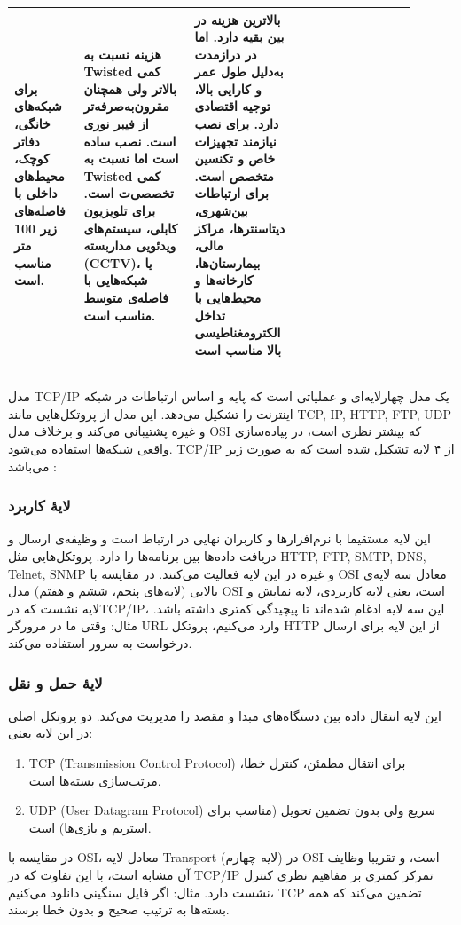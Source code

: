 \documentclass[12pt]{article}
\begin{document}
\begin{center}
\begin{table}[h]
\begin{tabular}{|p{0.15\linewidth}|p{0.25\linewidth}|p{0.25\linewidth}|p{0.25\linewidth}|}
				برای شبکه‌های خانگی، دفاتر کوچک، محیط‌های داخلی با فاصله‌های زیر 100 متر مناسب است. &
				هزینه نسبت به Twisted کمی بالاتر ولی همچنان مقرون‌به‌صرفه‌تر از فیبر نوری است. 
				نصب ساده است اما نسبت به Twisted کمی تخصصی‌ت است. برای تلویزیون کابلی، 
				سیستم‌های ویدئویی مداربسته (CCTV)، یا شبکه‌هایی با فاصله‌ی متوسط مناسب است. &
				بالاترین هزینه در بین بقیه دارد. اما در درازمدت به‌دلیل طول عمر و کارایی بالا، 
				توجیه اقتصادی دارد. برای نصب نیازمند تجهیزات خاص  و تکنسین متخصص است. 
				برای ارتباطات بین‌شهری، دیتاسنترها، مراکز مالی، بیمارستان‌ها، کارخانه‌ها و محیط‌هایی با 
				تداخل الکترومغناطیسی بالا مناسب است \\
				\hline
			\end{tabular}
		\end{table}
	\end{center}
	
	\subsection{}
	مدل TCP/IP یک مدل چهارلایه‌ای و عملیاتی است که پایه و اساس ارتباطات در شبکه اینترنت را تشکیل می‌دهد. این مدل از پروتکل‌هایی مانند \textenglish{TCP, IP, HTTP, FTP, UDP} و غیره پشتیبانی می‌کند و برخلاف مدل OSI که بیشتر نظری است، در پیاده‌سازی واقعی شبکه‌ها استفاده می‌شود. TCP/IP از ۴ لایه تشکیل شده است که به صورت زیر می‌باشد 
	\cite{a8, a9, a10}:
	\subsubsection*{لایهٔ کاربرد}
	این لایه مستقیما با نرم‌افزارها و کاربران نهایی در ارتباط است و وظیفه‌ی ارسال و دریافت داده‌ها بین برنامه‌ها را دارد. پروتکل‌هایی مثل \textenglish{HTTP, FTP, SMTP, DNS, Telnet, SNMP} و غیره در این لایه فعالیت می‌کنند. در مقایسه با OSI معادل سه لایه‌ی بالایی (لایه‌های پنجم، ششم و هفتم) مدل OSI است، یعنی لایه کاربردی، لایه نمایش و لایه نشست که درTCP/IP، این سه لایه ادغام شده‌اند تا پیچیدگی کمتری داشته باشد.  مثال: وقتی ما در مرورگر URL وارد می‌کنیم، پروتکل HTTP از این لایه برای ارسال درخواست به سرور استفاده می‌کند.
	\subsubsection*{لایهٔ حمل و نقل}
	این لایه انتقال داده بین دستگاه‌های مبدا و مقصد را مدیریت می‌کند. دو پروتکل اصلی در این لایه یعنی:
	\begin{enumerate}
		\item \textenglish{TCP (Transmission Control Protocol)} برای انتقال مطمئن، کنترل خطا، مرتب‌سازی بسته‌ها است.
		\item \textenglish{UDP (User Datagram Protocol)} سریع ولی بدون تضمین تحویل (مناسب برای استریم و بازی‌ها) است.
	\end{enumerate}
	در مقایسه با OSI، معادل لایه Transport (لایه چهارم) در OSI است، و تقریبا وظایف آن مشابه است، با این تفاوت که در TCP/IP تمرکز کمتری بر مفاهیم نظری کنترل نشست دارد. مثال: اگر فایل سنگینی دانلود می‌کنیم، TCP تضمین می‌کند که همه بسته‌ها به ترتیب صحیح و بدون خطا برسند.
\end{document}
